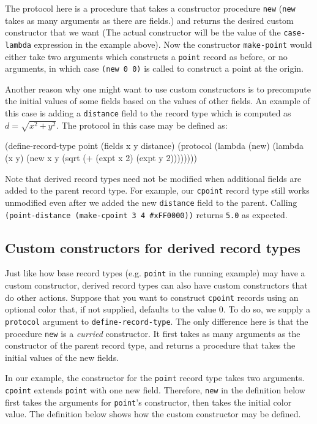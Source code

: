 \documentclass[onecolumn, 12pt, twoside, openright, dvipdfm]{book}
\begin{document}
The protocol here is a procedure that takes a constructor procedure
\texttt{new} (\texttt{new} takes as many arguments as there are
fields.) and returns the desired custom constructor that we want
(The actual constructor will be the value of the
\texttt{case-lambda} expression in the example above).
Now the constructor \texttt{make-point} would either take two
arguments which constructs a \texttt{point} record as before, or no
arguments, in which case \texttt{(new 0 0)} is called to construct a
point at the origin. 

Another reason why one might want to use custom constructors is to
precompute the initial values of some fields based on the values of
other fields.  An example of this case is adding a \texttt{distance}
field to the record type which is computed as
$d = \sqrt{x^2+y^2}$.  The protocol in this case may be defined as:

\begin{CodeInline}
(define-record-type point
  (fields x y distance)
  (protocol
    (lambda (new)
      (lambda (x y)
        (new x y (sqrt (+ (expt x 2) (expt y 2))))))))
\end{CodeInline}

Note that derived record types need not be modified when additional
fields are added to the parent record type.  For example, our
\texttt{cpoint} record type still works unmodified even after we
added the new \texttt{distance} field to the parent.  
Calling \texttt{(point-distance (make-cpoint 3 4 \#xFF0000))}
returns \texttt{5.0} as expected.

\subsection{Custom constructors for derived record types}

Just like how base record types (e.g. \texttt{point} in the running
example) may have a custom constructor, derived record types can
also have custom constructors that do other actions.  Suppose that
you want to construct \texttt{cpoint} records using an optional
color that, if not supplied, defaults to the value 0.  To do so, we
supply a \texttt{protocol} argument to \texttt{define-record-type}.
The only difference here is that the procedure \texttt{new} is a
\emph{curried} constructor.  It first takes as many arguments as the
constructor of the parent record type, and returns a procedure that
takes the initial values of the new fields.  

In our example, the constructor for the \texttt{point} record type
takes two arguments.  \texttt{cpoint} extends \texttt{point} with
one new field.  Therefore, \texttt{new} in the definition below
first takes the arguments for \texttt{point}'s constructor, then
takes the initial color value.  The definition below shows how the
custom constructor may be defined.
\end{document}
